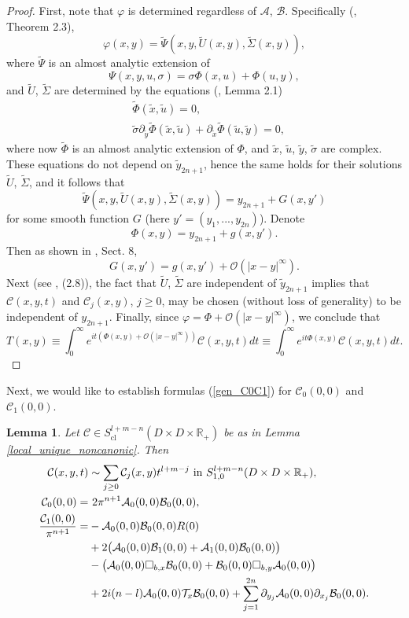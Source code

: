 \documentclass{article}
\newtheorem{lemma}[theorem]{Lemma}
\newcommand{\RR}{\mathbb R}
\newcommand{\mca}{\mathcal A}
\newcommand{\mcb}{\mathcal B}
\newcommand{\mcc}{\mathcal C}
\newcommand{\mct}{\mathcal T}
\newcommand{\mco}{\mathcal O}
\DeclareMathOperator{\cl}{cl}
\begin{document}
\begin{proof}
First, note that $\varphi$ is determined regardless of $\mca$, $\mcb$. Specifically (\cite{ms}, Theorem 2.3),
\begin{equation*} \varphi(x,y) = \tilde \Psi(x,y, \tilde U(x,y), \tilde \Sigma(x,y)),\end{equation*}
where $\tilde \Psi$ is an almost analytic extension of $$\Psi(x,y,u,\sigma) = \sigma \Phi(x,u) + \Phi(u,y),$$ and $\tilde U$, $\tilde \Sigma$ are determined by the equations (\cite{ms}, Lemma 2.1)
\begin{equation*} \begin{aligned} &\tilde \Phi(\tilde x,\tilde u) = 0,\\ &\tilde\sigma \partial_{\tilde y} \tilde \Phi(\tilde x,\tilde u) + \partial_{\tilde x} \tilde \Phi(\tilde u,\tilde y) = 0,\end{aligned} \end{equation*}
where now $\tilde \Phi$ is an almost analytic extension of $\Phi$, and $\tilde x$, $\tilde u$, $\tilde y$, $\tilde \sigma$ are complex. These equations do not depend on $\tilde y_{2n+1}$, hence the same holds for their solutions $\tilde U$, $\tilde \Sigma$, and it follows that
$$\tilde \Psi(x,y, \tilde U(x,y),\tilde \Sigma(x,y)) = y_{2n+1} + G(x,y')$$
for some smooth function $G$ (here $y' = (y_1, ..., y_{2n})$). Denote $$\Phi(x,y) = y_{2n+1} + g(x,y').$$Then as shown in \cite{hsiaomari2}, Sect. 8, $$G(x,y') = g(x,y') + \mco(|x-y|^\infty).$$ Next (see \cite{ms}, (2.8)), the fact that $\tilde U$, $\tilde \Sigma$ are independent of $\tilde y_{2n+1}$ implies that $\mcc(x,y,t)$ and $\mcc_j(x,y)$, $j \ge 0$, may be chosen (without loss of generality) to be independent of $y_{2n+1}$.
%
Finally, since $\varphi = \Phi + \mco(|x-y|^\infty)$, we conclude that $$T(x,y) \equiv \int_0^\infty e^{it (\Phi(x,y) + \mco(|x-y|^\infty))} \mcc(x,y,t) dt \equiv \int_0^\infty e^{it \Phi(x,y)} \mcc(x,y,t)dt.$$
\end{proof}
Next, we would like to establish formulas (\ref{gen_C0C1}) for $\mcc_0(0,0)$ and $\mcc_1(0,0)$.
%
\begin{lemma} Let $\mcc \in S^{l+m-n}_{\cl}(D \times D \times \RR_+)$ be as in Lemma \ref{local_unique_noncanonic}. Then \begin{equation*}\begin{aligned} \mcc(x,y,t) &\sim \sum_{j \ge 0} \mcc_j(x,y) t^{l+m -j}\ \text{in } S^{l+m-n}_{1,0}(D \times D \times \RR_+),\\ \mcc_0(0,0) = &\ 2\pi^{n+1} \mca_0(0,0) \mcb_0(0,0),\\ \frac{\mcc_1(0,0)}{\pi^{n+1}} = &- \mca_0(0,0) \mcb_0(0,0) R(0)\\ & + 2\big{(}\mca_0(0,0) \mcb_1(0,0) + \mca_1(0,0) \mcb_0(0,0) \big{)}\\ & -\big{(}\mca_0(0,0) \square_{b,x} \mcb_0(0,0) + \mcb_0(0,0) \square_{b,y} \mca_0(0,0)\big{)}\\ &+2i(n-l) \mca_0(0,0)\mct_x \mcb_0(0,0) + \sum_{j=1}^{2n} \partial_{y_j} \mca_0(0,0) \partial_{x_j} \mcb_0(0,0). \end{aligned}\end{equation*} \end{lemma}
\end{document}
